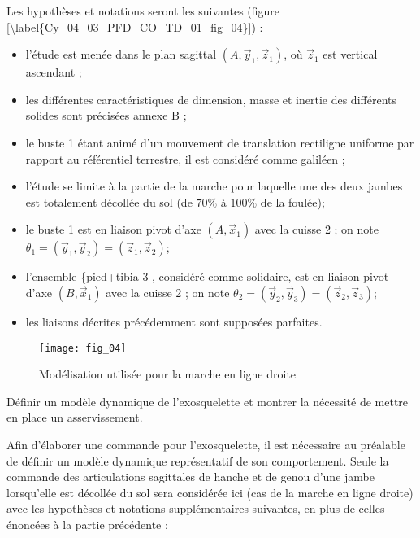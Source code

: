 Les hypothèses et notations seront les suivantes (figure \ref{\label{Cy_04_03_PFD_CO_TD_01_fig_04}}) :
\begin{itemize}
  \item l'étude est menée dans le plan sagittal $\left(A, \vec{y}_{1}, \vec{z}_{1}\right)$, où $\vec{z}_{1}$ est vertical ascendant ;
  \item les différentes caractéristiques de dimension, masse et inertie des différents solides sont précisées annexe B ;
  \item le buste 1 étant animé d'un mouvement de translation rectiligne uniforme par rapport au référentiel terrestre, il est considéré comme galiléen ;
  \item l'étude se limite à la partie de la marche pour laquelle une des deux jambes est totalement décollée du sol (de $70 \%$ à $100 \%$ de la foulée);%
  \item le buste 1 est en liaison pivot d'axe $\left(A, \vec{x}_{1}\right)$ avec la cuisse 2 ; on note $\theta_{1}=\left(\vec{y}_{1}, \vec{y}_{2}\right)=\left(\vec{z}_{1}, \vec{z}_{2}\right)$;
  \item l'ensemble \{pied+tibia 3 , considéré comme solidaire, est en liaison pivot d'axe $\left(B, \vec{x}_{1}\right)$ avec la cuisse 2 ; on note $\theta_{2}=\left(\vec{y}_{2}, \vec{y}_{3}\right)=\left(\vec{z}_{2}, \vec{z}_{3}\right)$;
  \item les liaisons décrites précédemment sont supposées parfaites.
\end{itemize}

\begin{figure}
\texttt{[image: fig\_04]}
\caption{Modélisation utilisée pour la marche en ligne droite \label{Cy_04_03_PFD_CO_TD_01_fig_04}}
\end{figure}

\begin{obj}
Définir un modèle dynamique de l’exosquelette et montrer la nécessité de mettre en place un asservissement.
\end{obj}

Afin d'élaborer une commande pour l'exosquelette, il est nécessaire au préalable de définir un modèle dynamique représentatif de son comportement. Seule la commande des articulations sagittales de hanche et de genou d'une jambe lorsqu'elle est décollée du sol %
sera considérée ici (cas de la marche en ligne droite) avec les hypothèses et notations supplémentaires suivantes, en plus de celles énoncées à la partie précédente :

